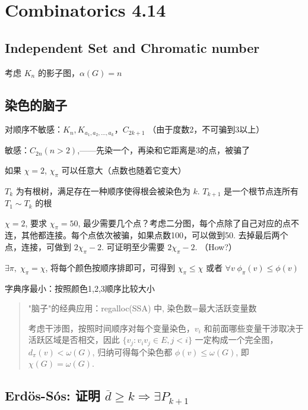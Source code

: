 \chapter{Combinatorics 4.14}
\label{ch:250414}

\section{Independent Set and Chromatic number}


考虑 $K_n$ 的影子图，$\alpha(G)=n$

\section{染色的脑子}


对顺序不敏感：$K_n,K_{a_1,a_2,\dots,a_k}$，$C_{2k+1}$ （由于度数2，不可骗到3以上）

敏感：$C_{2n}(n>2)$,——先染一个，再染和它距离是3的点，被骗了

如果 $\chi=2$, $\chi_\pi$ 可以任意大（点数也随着它变大）

$T_k$ 为有根树，满足存在一种顺序使得根会被染色为 $k$. $T_{k+1}$ 是一个根节点连所有 $T_1\sim T_k$ 的根

$\chi=2$, 要求 $\chi_\pi=50$, 最少需要几个点？考虑二分图，每个点除了自己对应的点不连，其他都连接。每个点依次被骗，如果点数100，可以做到50. 去掉最后两个点，连接，可做到 $2\chi_\pi-2$. 可证明至少需要 $2\chi_\pi-2$. （How?）

$\exists \pi, \;\chi_\pi=\chi$, 将每个颜色按顺序排即可，可得到 $\chi_\pi\leq\chi$ 或者 $\forall v\;\phi_\pi(v)\leq\phi(v)$

字典序最小：按照颜色1,2,3顺序比较大小

\begin{quotation}
"脑子"的经典应用：regalloc(SSA) 中, 染色数=最大活跃变量数

考虑干涉图，按照时间顺序对每个变量染色，$v_i$ 和前面哪些变量干涉取决于活跃区域是否相交，因此 $\{v_j:v_iv_j\in E, j<i\}$ 一定构成一个完全图，$d_\pi(v)<\omega(G)$, 归纳可得每个染色都 $\phi(v)\leq\omega(G)$, 即 $\chi(G)=\omega(G)$.
\end{quotation}

\section{Erdös-Sós: 证明 $\overline{d}\geq k\Rightarrow \exists P_{k+1}$}

